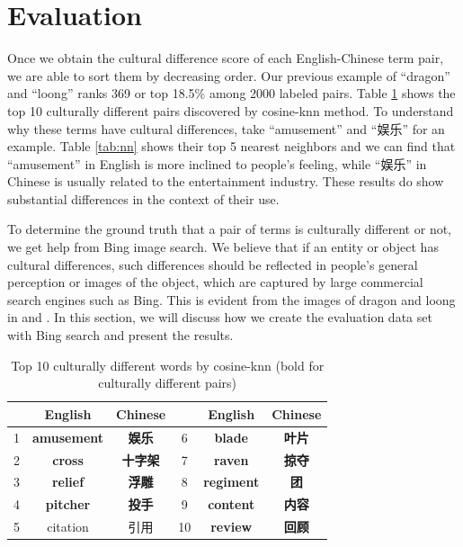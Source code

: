 \section{Evaluation}
\label{sec:eval}

Once we obtain the cultural difference score of 
each English-Chinese term pair, we are able to sort them by decreasing
order. Our previous example of ``dragon'' and ``loong'' ranks 369 or
top 18.5\% among 2000 labeled pairs. 
Table \ref{tab:top10} shows the top 10 culturally different 
pairs discovered by cosine-knn method. To understand why
these terms have cultural differences, take ``amusement'' and ``娱乐'' for an
example. Table \ref{tab:nn} shows their top 5 nearest neighbors and we can find that ``amusement'' in English is more inclined to people's feeling, while ``娱乐'' in Chinese is usually related to the entertainment industry.  These results do show substantial 
differences in the context of their use. 

To determine the ground truth that a pair of terms is culturally 
different or not, we get help from Bing image search.
We believe that if an entity or object has cultural differences, such
differences should be reflected in people's general perception or 
images of the object, which are captured by large commercial search
engines such as Bing. This is evident from the images of 
dragon and loong in  and . 
In this section, we will discuss how we create the evaluation 
data set with Bing search and present the results.

\begin{table}
\small
\centering
\begin{tabular}{|c|c|c|c|c|c|}
\hline
 & English & Chinese &  & English & Chinese\\ \hline
\hline
1 & \bf{amusement} & \bf{娱乐} & 6 &  \bf{blade} &  \bf{叶片} \\
\hline
2 & \bf{cross} & \bf{十字架} & 7 &  \bf{raven} &  \bf{掠夺} \\
\hline
3 &  \bf{relief} &  \bf{浮雕} & 8 & \bf{regiment} &  \bf{团} \\
\hline
4 &  \bf{pitcher} &  \bf{投手} & 9 &  \bf{content} &  \bf{内容} \\
\hline
5 &  citation &  引用 & 10 &  \bf{review} &  \bf{回顾} \\

\hline
\end{tabular}
\caption{Top 10 culturally different words by cosine-knn (bold for culturally different pairs)}
\label{tab:top10}
\end{table}

